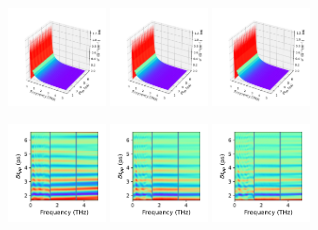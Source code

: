 \documentclass[a4paper]{article}
\begin{document}
\begin{figure}[H]
  \centering
  \includegraphics[width=0.23\textwidth]{cond3d_imag-A0-v0-imp0.pdf}
  \includegraphics[width=0.23\textwidth]{cond3d_imag-A0-v1-imp0.pdf}
  \includegraphics[width=0.23\textwidth]{cond3d_imag-A0-v2-imp0.pdf}
\end{figure}
\begin{figure}[H]
  \centering
  \includegraphics[width=0.23\textwidth]{cond_pcolor-A0-v0-imp0.pdf}
  \includegraphics[width=0.23\textwidth]{cond_pcolor-A0-v1-imp0.pdf}
  \includegraphics[width=0.23\textwidth]{cond_pcolor-A0-v2-imp0.pdf}
\end{figure}
\end{document}
